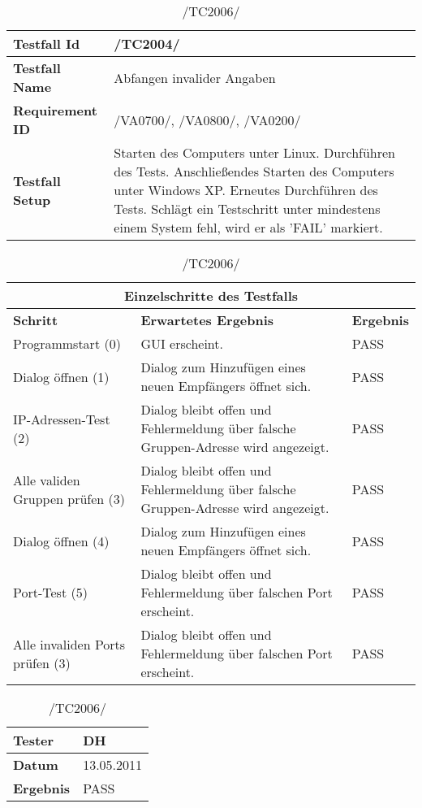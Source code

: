 \begin{table}[h]
\caption{/TC2006/}
\label{tab:TC2006}
\begin{center}
\begin{tabular}{|p{3.5cm}|p{11cm}|}
\hline
\textbf{Testfall Id} & /TC2004/\\
\hline
\textbf{Testfall Name} & Abfangen invalider Angaben\\
\hline
\textbf{Requirement ID} & /VA0700/, /VA0800/, /VA0200/\\
\hline
\textbf{Testfall Setup} & Starten des Computers unter Linux. Durchführen des Tests.
Anschließendes Starten des Computers unter Windows XP. Erneutes Durchführen des Tests. Schlägt ein Testschritt unter mindestens einem System fehl, wird er als 'FAIL' markiert.\\
\hline
\end{tabular}
\begin{tabular}{|p{4cm}|p{7.8cm}|p{2.3cm}|}
\multicolumn{3}{|c|}{\textbf{Einzelschritte des Testfalls}} \\
\hline
\textbf{Schritt} & \textbf{Erwartetes Ergebnis} & \textbf{Ergebnis}\\
\hline
Programmstart (0) & GUI
erscheint. & PASS\\
\hline
Dialog öffnen (1) & Dialog zum Hinzufügen eines neuen Empfängers öffnet sich. & PASS\\
\hline
IP-Adressen-Test (2) & Dialog bleibt offen und Fehlermeldung über falsche
Gruppen-Adresse wird angezeigt. & PASS\\
\hline
Alle validen Gruppen prüfen (3) & Dialog bleibt offen und Fehlermeldung über falsche
Gruppen-Adresse wird angezeigt. & PASS\\
\hline
Dialog öffnen (4) & Dialog zum Hinzufügen eines neuen Empfängers öffnet sich. & PASS\\
\hline
Port-Test (5) & Dialog bleibt offen und Fehlermeldung über falschen
Port erscheint. & PASS\\
\hline
Alle invaliden Ports prüfen (3) & Dialog bleibt offen und Fehlermeldung über falschen
Port erscheint. & PASS\\
\hline
\end{tabular}
\begin{tabular}{|p{3.5cm}|p{11cm}|}
\textbf{Tester} & DH\\
\hline
\textbf{Datum} & 13.05.2011\\
\hline
\textbf{Ergebnis} & PASS\\
\hline
\end{tabular}
\end{center}
\end{table}